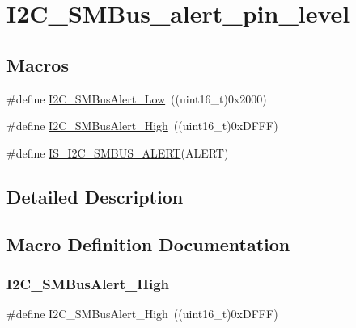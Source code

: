 \hypertarget{group___i2_c___s_m_bus__alert__pin__level}{}\section{I2\+C\+\_\+\+S\+M\+Bus\+\_\+alert\+\_\+pin\+\_\+level}
\label{group___i2_c___s_m_bus__alert__pin__level}
\subsection*{Macros}
\begin{DoxyCompactItemize}
\item 
\#define \mbox{\hyperlink{group___i2_c___s_m_bus__alert__pin__level_ga6f923166107afb8aad1d7d1a87048d6e}{I2\+C\+\_\+\+S\+M\+Bus\+Alert\+\_\+\+Low}}~((uint16\+\_\+t)0x2000)
\item 
\#define \mbox{\hyperlink{group___i2_c___s_m_bus__alert__pin__level_gac3ab64f43ef90f0f83f9c88981aaa862}{I2\+C\+\_\+\+S\+M\+Bus\+Alert\+\_\+\+High}}~((uint16\+\_\+t)0x\+D\+F\+F\+F)
\item 
\#define \mbox{\hyperlink{group___i2_c___s_m_bus__alert__pin__level_ga61b0c91563eb4bd598329241fe7d3bb4}{I\+S\+\_\+\+I2\+C\+\_\+\+S\+M\+B\+U\+S\+\_\+\+A\+L\+E\+RT}}(A\+L\+E\+RT)
\end{DoxyCompactItemize}


\subsection{Detailed Description}


\subsection{Macro Definition Documentation}
\mbox{\label{group___i2_c___s_m_bus__alert__pin__level_gac3ab64f43ef90f0f83f9c88981aaa862}} 
\subsubsection{\texorpdfstring{I2C\_SMBusAlert\_High}{I2C\_SMBusAlert\_High}}
{\footnotesize\ttfamily \#define I2\+C\+\_\+\+S\+M\+Bus\+Alert\+\_\+\+High~((uint16\+\_\+t)0x\+D\+F\+F\+F)}

